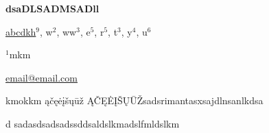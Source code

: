 \documentclass[12pt, twoside, a4paper, hidelinks]{article}
\begin{document}
\begin{center} \fontsize{14}{15}\selectfont \textbf{ dsaDLSADMSADll } \end{center}
\vspace{-0.8cm}

\begin{center} \fontsize{12}{13}\selectfont \underline{abcdkh}$^{9}$, w$^{2}$, ww$^{3}$, e$^{5}$, r$^{5}$, t$^{3}$, y$^{4}$, u$^{6}$ \end{center}
\vspace{-.5cm}

\begin{center} \fontsize{10}{11}\selectfont $^{1}$mkm
    
    \underline{email@email.com} \end{center}

\fontsize{10}{11}\selectfont
kmokkm ąčęėįšųūž ĄČĘĖĮŠŲŪŽsadsrimantasxsajdlnsanlkdsa

d
sadasdsadsadssddsaldslkmadslfmldslkm
\end{document}
